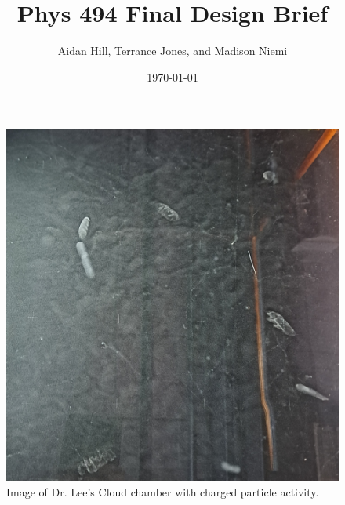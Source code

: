 \documentclass{article}
\title{Phys 494 Final Design Brief}
\author{Aidan Hill, Terrance Jones, and Madison Niemi}
\date{\today}
\begin{document}
\maketitle

\begin{figure}[h!]
    \centering
    \includegraphics[width=1\linewidth]{10}
    \caption{Image of Dr. Lee's Cloud chamber with charged particle activity.}
\end{figure}

\newpage
\end{document}
